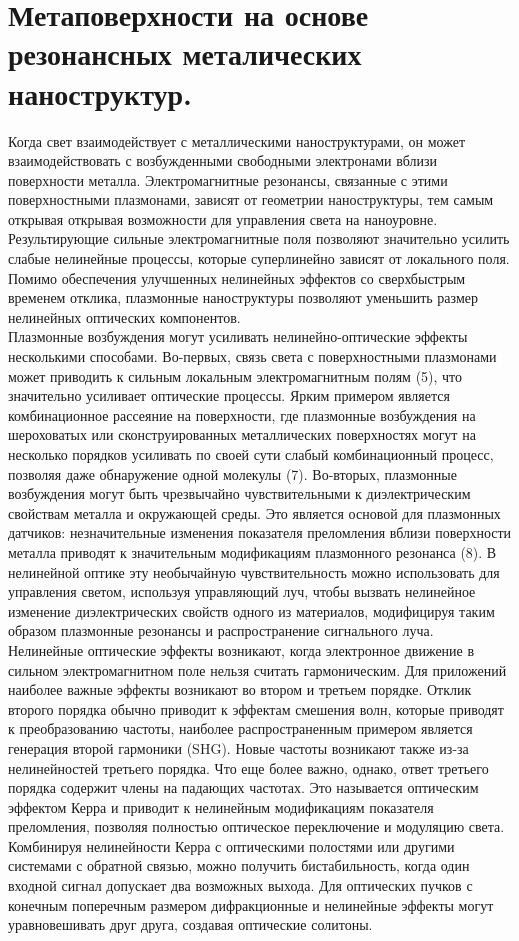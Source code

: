 \section{Метаповерхности на основе резонансных металических наноструктур.}
\hspace*{2mm}
Когда свет взаимодействует с металлическими наноструктурами, он может взаимодействовать с возбужденными свободными электронами вблизи поверхности металла. Электромагнитные резонансы, связанные с этими поверхностными плазмонами, зависят от геометрии наноструктуры, тем самым открывая открывая возможности для управления света на наноуровне. Результирующие сильные электромагнитные поля позволяют значительно усилить слабые нелинейные процессы, которые суперлинейно зависят от локального поля. Помимо обеспечения улучшенных нелинейных эффектов со сверхбыстрым временем отклика, плазмонные наноструктуры позволяют уменьшить размер нелинейных оптических компонентов.
\\
\hspace*{2mm}
Плазмонные возбуждения могут усиливать нелинейно-оптические эффекты несколькими способами. 
Во-первых, связь света с поверхностными плазмонами может приводить к сильным локальным электромагнитным полям (5), что значительно усиливает оптические процессы. Ярким примером является комбинационное рассеяние на поверхности, где плазмонные возбуждения на шероховатых или сконструированных металлических поверхностях могут на несколько порядков усиливать по своей сути слабый комбинационный процесс, позволяя даже обнаружение одной молекулы (7).
Во-вторых, плазмонные возбуждения могут быть чрезвычайно чувствительными к диэлектрическим свойствам металла и окружающей среды. Это является основой для плазмонных датчиков: незначительные изменения показателя преломления вблизи поверхности металла приводят к значительным модификациям плазмонного резонанса (8). В нелинейной оптике эту необычайную чувствительность можно использовать для управления светом, используя управляющий луч, чтобы вызвать нелинейное изменение диэлектрических свойств одного из материалов, модифицируя таким образом плазмонные резонансы и распространение сигнального луча.
\\
\hspace*{2mm}
Нелинейные оптические эффекты возникают, когда электронное движение в сильном электромагнитном поле нельзя считать гармоническим.   Для приложений наиболее важные эффекты возникают во втором и третьем порядке. Отклик второго порядка обычно приводит к эффектам смешения волн, которые приводят к преобразованию частоты, наиболее распространенным примером является генерация второй гармоники (SHG). Новые частоты возникают также из-за нелинейностей третьего порядка. Что еще более важно, однако, ответ третьего порядка содержит члены на падающих частотах. Это называется оптическим эффектом Керра и приводит к нелинейным модификациям показателя преломления, позволяя полностью оптическое переключение и модуляцию света. Комбинируя нелинейности Керра с оптическими полостями или другими системами с обратной связью, можно получить бистабильность, когда один входной сигнал допускает два возможных выхода. Для оптических пучков с конечным поперечным размером дифракционные и нелинейные эффекты могут уравновешивать друг друга, создавая оптические солитоны.
